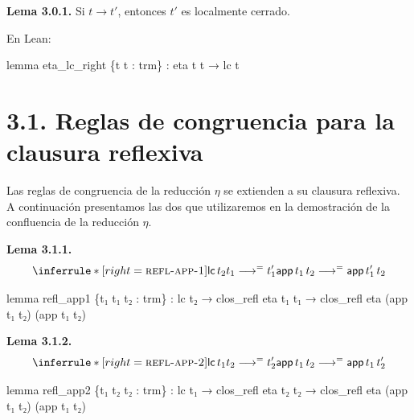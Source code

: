 \documentclass[
  spanish,
  letterpaper,
  DIV=11,
  numbers=noendperiod]{scrreprt}
\newenvironment{Shaded}{\begin{snugshade}}{\end{snugshade}}
\newcommand{\KeywordTok}[1]{\textcolor[rgb]{0.00,0.23,0.31}{\textbf{#1}}}
\newcommand{\NormalTok}[1]{\textcolor[rgb]{0.00,0.23,0.31}{#1}}
\renewcommand{\NormalTok}[1]{\textcolor[HTML]{000000}{#1}}
\renewcommand{\KeywordTok}[1]{\textcolor[HTML]{0000FF}{#1}}
\theoremstyle{remark}
\begin{document}
\textbf{Lema 3.0.1.} Si \(t \longrightarrow t'\), entonces \(t'\) es
localmente cerrado.

En Lean:

\begin{Shaded}
\begin{Highlighting}[]
\KeywordTok{lemma}\NormalTok{ eta\_lc\_right \{t t\textquotesingle{} : trm\} :}
\NormalTok{    eta t t\textquotesingle{} → lc t\textquotesingle{}}
\end{Highlighting}
\end{Shaded}

\section{3.1. Reglas de congruencia para la clausura
reflexiva}\label{reglas-de-congruencia-para-la-clausura-reflexiva}

Las reglas de congruencia de la reducción \(\eta\) se extienden a su
clausura reflexiva. A continuación presentamos las dos que utilizaremos
en la demostración de la confluencia de la reducción \(\eta\).

\textbf{Lema 3.1.1.} \[
\inferrule*[right=\textsc{refl-app-1}]
  {\mathsf{lc} \, t_2 \\ 
    t_1 \longrightarrow^{=} t_1'}
  {\mathsf{app}\,t_1\,t_2
   \longrightarrow^{=}
   \mathsf{app}\,t_1'\,t_2}
\]

\begin{Shaded}
\begin{Highlighting}[]
\KeywordTok{lemma}\NormalTok{ refl\_app1 \{t₁ t₁\textquotesingle{} t₂ : trm\} :}
\NormalTok{    lc t₂ →}
\NormalTok{    clos\_refl eta t₁ t₁\textquotesingle{} →}
\NormalTok{    clos\_refl eta (app t₁ t₂) (app t₁\textquotesingle{} t₂)}
\end{Highlighting}
\end{Shaded}

\textbf{Lema 3.1.2.} \[
\inferrule*[right=\textsc{refl-app-2}]
  {\mathsf{lc} \, t_1 \\
   t_2 \longrightarrow^{=} t_2'}
  {\mathsf{app}\,t_1\,t_2
   \longrightarrow^{=}
   \mathsf{app} \, t_1 \, t_2'}
\]

\begin{Shaded}
\begin{Highlighting}[]
\KeywordTok{lemma}\NormalTok{ refl\_app2 \{t₁ t₂ t₂\textquotesingle{} : trm\} :}
\NormalTok{    lc t₁ →}
\NormalTok{    clos\_refl eta t₂ t₂\textquotesingle{} →}
\NormalTok{    clos\_refl eta (app t₁ t₂) (app t₁ t₂\textquotesingle{}) }
\end{Highlighting}
\end{Shaded}
\end{document}
